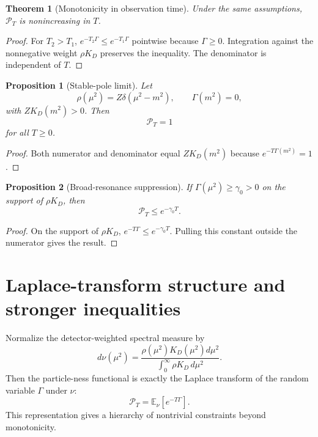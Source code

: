 \documentclass[11pt]{article}
\newtheorem{theorem}{Theorem}
\newtheorem{proposition}{Proposition}
\theoremstyle{remark}
\begin{document}
\begin{theorem}[Monotonicity in observation time]
Under the same assumptions, $\mathcal P_T$ is nonincreasing in $T$.
\end{theorem}

\begin{proof}
For $T_2>T_1$, $e^{-T_2\Gamma}\le e^{-T_1\Gamma}$ pointwise because $\Gamma\ge0$. Integration against the nonnegative weight $\rho K_D$ preserves the inequality. The denominator is independent of $T$.
\end{proof}

\begin{proposition}[Stable-pole limit]
Let
\begin{equation}
\rho(\mu^2)=Z\delta(\mu^2-m^2),\qquad \Gamma(m^2)=0,
\end{equation}
with $ZK_D(m^2)>0$. Then
\begin{equation}
\mathcal P_T=1
\end{equation}
for all $T\ge0$.
\end{proposition}

\begin{proof}
Both numerator and denominator equal $ZK_D(m^2)$ because $e^{-T\Gamma(m^2)}=1$.
\end{proof}

\begin{proposition}[Broad-resonance suppression]
If $\Gamma(\mu^2)\ge\gamma_0>0$ on the support of $\rho K_D$, then
\begin{equation}
\mathcal P_T\le e^{-\gamma_0 T}.
\end{equation}
\end{proposition}

\begin{proof}
On the support of $\rho K_D$, $e^{-T\Gamma}\le e^{-\gamma_0 T}$. Pulling this constant outside the numerator gives the result.
\end{proof}


\section{Laplace-transform structure and stronger inequalities}
Normalize the detector-weighted spectral measure by
\begin{equation}
 d\nu(\mu^2)
 =\frac{\rho(\mu^2)K_D(\mu^2)d\mu^2}
 {\int_0^\infty\rho K_D\,d\mu^2}.
 \label{eq:nu-measure}
\end{equation}
Then the particle-ness functional is exactly the Laplace transform of the random variable $\Gamma$ under $\nu$:
\begin{equation}
 \mathcal P_T=\mathbb E_\nu[e^{-T\Gamma}].
 \label{eq:laplace-structure}
\end{equation}
This representation gives a hierarchy of nontrivial constraints beyond monotonicity.
\end{document}
